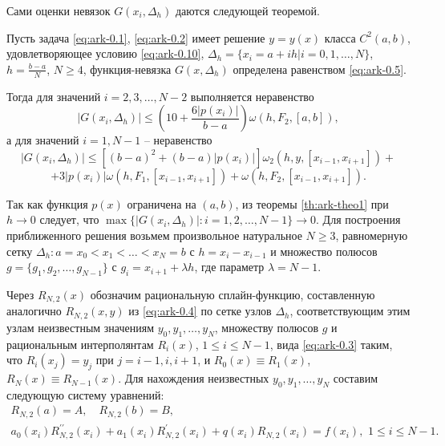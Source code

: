 Сами оценки невязок $G(x_i, \Delta_h)$ даются следующей теоремой.

\begin{theorem}\label{th:ark-theo1}
Пусть задача \eqref{eq:ark-0.1}, \eqref{eq:ark-0.2} имеет решение $y=y(x)$ класса $C^2(a,b)$, удовлетворяющее
условию \eqref{eq:ark-0.10}, $\Delta_h=\{x_i=a+ih |i=0,1,\dots,N\}$, $h=\frac{b-a}N$,
$N\geqslant 4$, функция-невязка $G(x, \Delta_h)$ определена равенством \eqref{eq:ark-0.5}.

Тогда для значений $i=2,3,\dots,N-2$ выполняется неравенство
\begin{equation*}\label{eq:ark-0.12}
|G(x_i,\Delta_h)|\leqslant
\left(10+\frac{6|p(x_i)|}{b-a}\right)\omega(h, F_2, [a,b]),
\end{equation*}
а для значений $i=1,N-1$  -- неравенство
$$
|G(x_i,\Delta_h)|\leqslant [(b-a)^2+(b-a)|p(x_i)|]\omega_2(h, y, [x_{i-1}, x_{i+1}])+
$$
\begin{equation*}\label{eq:ark-0.13}
+3|p(x_i)|\omega(h, F_1,[x_{i-1}, x_{i+1}])+
\omega(h, F_2, [x_{i-1}, x_{i+1}]).
\end{equation*}
\end{theorem}

Так как функция $p(x)$ ограничена на $(a,b)$, из теоремы \ref{th:ark-theo1} при $h\to 0$
следует, что
$\max\{|G(x_i, \Delta_h)|: i=1,2,\dots,N-1\}\to 0$.
Для построения приближенного решения возьмем произвольное натуральное $N\geqslant 3$,
равномерную сетку
$\Delta_h: a=x_0<x_1<\dots<x_N=b$ с $h=x_i-x_{i-1}$ и множество полюсов
$g=\{g_1,g_2,\dots,g_{N-1}\}$ с $g_i=x_{i+1}+\lambda h$, где параметр $\lambda=N-1$.

Через $R_{N,2}(x)$ обозначим рациональную сплайн-функцию, составленную
аналогично $R_{N,2}(x,y)$ из \eqref{eq:ark-0.4} по сетке узлов $\Delta_h$, соответствующим этим узлам
неизвестным
значениям $y_0,y_1,\dots,y_N$, множеству полюсов $g$ и рациональным интерполянтам
$R_i(x)$, $1\leqslant i\leqslant N-1$, вида \eqref{eq:ark-0.3} таким, что $R_i(x_j)=y_j$ при
$j=i-1,i,i+1$, и $R_0(x)\equiv R_1(x)$, $R_N(x)\equiv R_{N-1}(x)$.
Для нахождения неизвестных $y_0,y_1,\dots,y_N$ составим следующую систему уравнений:
\begin{equation}\label{eq:ark-2.1}
\begin{array}{lcl}
R_{N,2}(a)=A, \quad R_{N,2}(b)=B,\\
a_0(x_i)R^{\prime\prime}_{N,2}(x_i)+a_1(x_i)R^\prime_{N,2}(x_i)+q(x_i)R_{N,2}(x_i)=f(x_i),
\,\, 1\leqslant i\leqslant N-1.
\end{array}
\end{equation}

